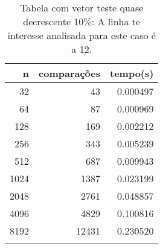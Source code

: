 \begin{table}[ht]
\centering
\begin{tabular}{rrr} \toprule
        n &    comparações &       tempo(s) \\ \midrule
      32  &             43 &      0.000497 \\
      64  &             87 &      0.000969 \\
     128  &            169 &      0.002212 \\
     256  &            343 &      0.005239 \\
     512  &            687 &      0.009943 \\
    1024  &           1387 &      0.023199 \\
    2048  &           2761 &      0.048857 \\
    4096  &           4829 &      0.100816 \\
    8192  &          12431 &      0.230520 \\
\bottomrule\addlinespace
\end{tabular}
\caption{Tabela com vetor teste quase decrescente 10\%: A linha te interesse analisada para este caso é a 12.}
\label{tab:quicksortQuaseDecresc10}
\end{table}
